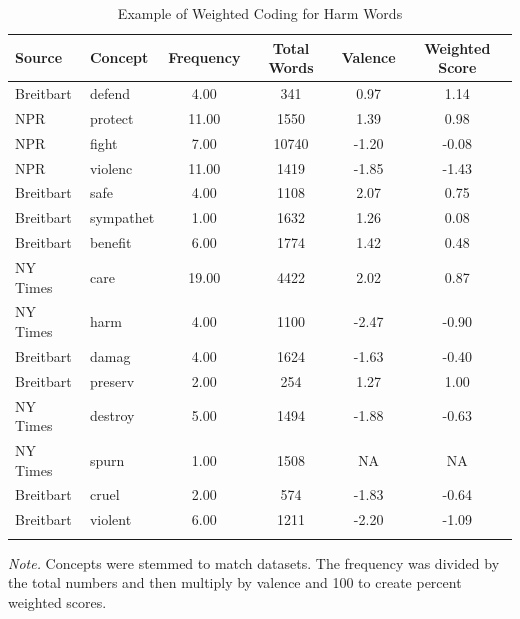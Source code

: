 \documentclass[
  man,floatsintext]{apa6}
\begin{document}
\begin{table}[ht]

\begin{center}
\begin{threeparttable}

\caption{\label{tab:example-weight}Example of Weighted Coding for Harm Words}

\footnotesize{

\begin{tabular}{llcccc}
\toprule
Source & Concept & Frequency & Total Words & Valence & Weighted Score\\
\midrule
Breitbart & defend & 4.00 & 341 & 0.97 & 1.14\\
NPR & protect & 11.00 & 1550 & 1.39 & 0.98\\
NPR & fight & 7.00 & 10740 & -1.20 & -0.08\\
NPR & violenc & 11.00 & 1419 & -1.85 & -1.43\\
Breitbart & safe & 4.00 & 1108 & 2.07 & 0.75\\
Breitbart & sympathet & 1.00 & 1632 & 1.26 & 0.08\\
Breitbart & benefit & 6.00 & 1774 & 1.42 & 0.48\\
NY Times & care & 19.00 & 4422 & 2.02 & 0.87\\
NY Times & harm & 4.00 & 1100 & -2.47 & -0.90\\
Breitbart & damag & 4.00 & 1624 & -1.63 & -0.40\\
Breitbart & preserv & 2.00 & 254 & 1.27 & 1.00\\
NY Times & destroy & 5.00 & 1494 & -1.88 & -0.63\\
NY Times & spurn & 1.00 & 1508 & NA & NA\\
Breitbart & cruel & 2.00 & 574 & -1.83 & -0.64\\
Breitbart & violent & 6.00 & 1211 & -2.20 & -1.09\\
\bottomrule
\addlinespace
\end{tabular}

}

\begin{tablenotes}[para]
\normalsize{\textit{Note.} Concepts were stemmed to match datasets. The frequency was divided by the total numbers and then multiply by valence and 100 to create percent weighted scores.}
\end{tablenotes}

\end{threeparttable}
\end{center}

\end{table}
\end{document}
